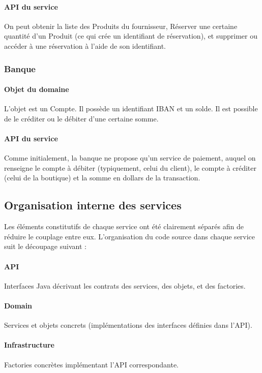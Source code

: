 \documentclass[a4paper,12pt]{article}
\begin{document}
\paragraph{API du service}
On peut obtenir la liste des Produits du fournisseur, Réserver une certaine quantité d'un Produit (ce qui crée un identifiant de réservation), et supprimer ou accéder à une réservation à l'aide de son identifiant.

\subsubsection{Banque}
\paragraph{Objet du domaine}
L'objet est un Compte. Il possède un identifiant IBAN et un solde. Il est possible de le créditer ou le débiter d'une certaine somme.
\paragraph{API du service}
Comme initialement, la banque ne propose qu'un service de paiement, auquel on renseigne le compte à débiter (typiquement, celui du client), le compte à créditer (celui de la boutique) et la somme en dollars de la transaction.

\subsection{Organisation interne des services}
Les éléments constitutifs de chaque service ont été clairement séparés afin de réduire le couplage entre eux.
L'organisation du code source dans chaque service suit le découpage suivant :

\paragraph{API}
Interfaces Java décrivant les contrats des services, des objets, et des factories.
\paragraph{Domain}
Services et objets concrets (implémentations des interfaces définies dans l'API).
\paragraph{Infrastructure}
Factories concrètes implémentant l'API correspondante.
\end{document}
